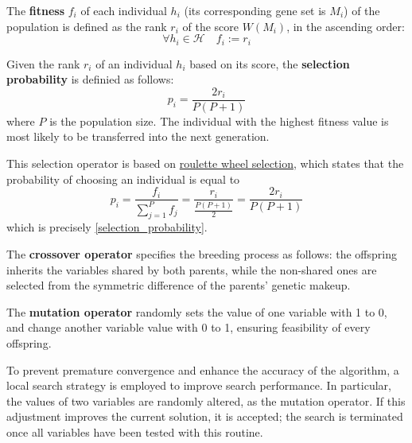 \begin{definition}
    The \textbf{fitness} $f_i$ of each individual $h_i$ (its corresponding gene set is $M_i$) of the population is defined as the rank $r_i$ of the score $W(M_i)$, in the ascending order: $$\forall h_i \in \mathcal H \quad f_i := r_i$$ 
\end{definition}

\begin{definition} \label{selection_probability}
    Given the rank $r_i$ of an individual $h_i$ based on its score, the \textbf{selection probability} is definied as follows: $$p_i = \dfrac{2r_i}{P(P + 1)}$$ where $P$ is the population size. The individual with the highest fitness value is most likely to be transferred into the next generation.
\end{definition}

This selection operator is based on \href{https://en.wikipedia.org/wiki/Selection_(genetic_algorithm)#Roulette_wheel_selection}{roulette wheel selection}, which states that the probability of choosing an individual is equal to $$p_i = \dfrac{f_i}{\sum_{j = 1}^P {f_j}} = \dfrac{r_i}{\frac{P(P + 1)}{2}} = \dfrac{2r_i}{P(P+1)}$$ which is precisely \cref{selection_probability}.

\begin{definition}
    The \textbf{crossover operator} specifies the breeding process as follows: the offspring inherits the variables shared by both parents, while the non-shared ones are selected from the symmetric difference of the parents' genetic makeup.
\end{definition}

\begin{definition}
    The \textbf{mutation operator} randomly sets the value of one variable with 1 to 0, and change another variable value with 0 to 1, ensuring feasibility of every offspring.
\end{definition}

\begin{definition}
    To prevent premature convergence and enhance the accuracy of the algorithm, a local search strategy is employed to improve search performance. In particular, the values of two variables are randomly altered, as the mutation operator. If this adjustment improves the current solution, it is accepted; the search is terminated once all variables have been tested with this routine.
\end{definition}

